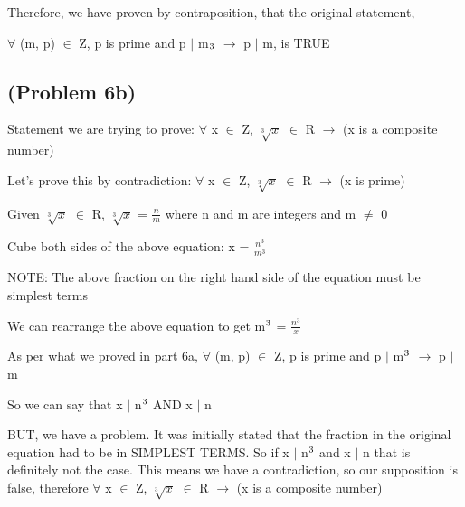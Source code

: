 \documentclass{article}
\begin{document}
\par\vspace{0.5cm}\noindent Therefore, we have proven by contraposition, that the original statement, \par\noindent $\forall$ (m, p) $\in$ Z, p is prime and p $\mid$ m$\textsubscript{3}$ $\rightarrow$ p $\mid$ m, is TRUE

\subsection{(Problem 6b)}

Statement we are trying to prove: $\forall$ x $\in$ Z, $\sqrt[3]{x}$ $\in$ R $\rightarrow$ (x is a composite number)

\par\vspace{0.5cm}\noindent Let's prove this by contradiction: $\forall$ x $\in$ Z, $\sqrt[3]{x}$ $\in$ R $\rightarrow$ (x is prime)

\par\vspace{0.5cm}\noindent Given $\sqrt[3]{x}$ $\in$ R, $\sqrt[3]{x}$ = $\frac{n}{m}$ where n and m are integers and m $\neq$ 0

\par\vspace{0.5cm}\noindent Cube both sides of the above equation: x = $\frac{n^3}{m^3}$

\par\vspace{0.5cm}\noindent NOTE: The above fraction on the right hand side of the equation must be simplest terms

\par\vspace{0.5cm}\noindent We can rearrange the above equation to get m$\textsuperscript{3}$ = $\frac{n^3}{x}$

\par\vspace{0.5cm}\noindent As per what we proved in part 6a, $\forall$ (m, p) $\in$ Z, p is prime and p $\mid$ m$\textsuperscript{3}$ $\rightarrow$ p $\mid$ m

\par\vspace{0.5cm}\noindent So we can say that x $\mid$ n$\textsuperscript{3}$ AND x $\mid$ n

\par\vspace{0.5cm}\noindent BUT, we have a problem.  It was initially stated that the fraction in the original equation had to be in SIMPLEST TERMS.  So if x $\mid$ n$\textsuperscript{3}$ and x $\mid$ n that is definitely not the case.  This means we have a contradiction, so our supposition is false, therefore $\forall$ x $\in$ Z, $\sqrt[3]{x}$ $\in$ R $\rightarrow$ (x is a composite number)
\end{document}
